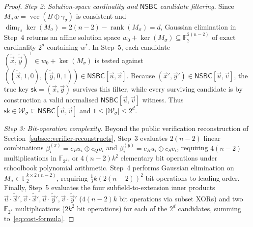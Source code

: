 \documentclass[11pt,a4paper]{article}
\theoremstyle{definition}
\theoremstyle{remark}
\newcommand{\Ftwo}{\mathbb{F}_2}
\newcommand{\Ftwok}{\mathbb{F}_{2^k}}
\newcommand{\NSBC}{\mathsf{NSBC}}
\newcommand{\sk}{\mathsf{sk}}
\newcommand{\rank}{\operatorname{rank}}
\newcommand{\vecF}{\operatorname{vec}}
\begin{document}
\begin{proof}
\smallskip\noindent
\emph{Step 2: Solution-space cardinality and $\NSBC$ candidate filtering.}
Since $M_\sigma w = \vecF(B \oplus \gamma_\sigma)$ is consistent and $\dim_{\Ftwo} \ker(M_\sigma) = 2(n-2) - \rank(M_\sigma) = d$, Gaussian elimination in Step~4 returns an affine solution space $w_0 + \ker(M_\sigma) \subseteq \Ftwo^{2(n-2)}$ of exact cardinality $2^d$ containing $w^*$. In Step~5, each candidate $(\tilde{\vec{x}}, \tilde{\vec{y}})^\top \in w_0 + \ker(M_\sigma)$ is tested against $((\tilde{\vec{x}}, 1, 0), (\tilde{\vec{y}}, 0, 1)) \in \NSBC[\vec{u}, \vec{v}]$. Because $(\vec{x}', \vec{y}') \in \NSBC[\vec{u}, \vec{v}]$, the true key $\sk = (\vec{x}, \vec{y})$ survives this filter, while every surviving candidate is by construction a valid normalised $\NSBC[\vec{u}, \vec{v}]$ witness. Thus $\sk \in \mathcal{W}_\sigma \subseteq \NSBC[\vec{u}, \vec{v}]$ and $1 \le |\mathcal{W}_\sigma| \le 2^d$.

\smallskip\noindent
\emph{Step 3: Bit-operation complexity.}
Beyond the public verification reconstruction of Section~\ref{subsec:verifier-reconstructs}, Step~3 evaluates $2(n-2)$ linear combinations $\beta_i^{(x)} = c_P u_i \oplus c_Q v_i$ and $\beta_i^{(y)} = c_R u_i \oplus c_S v_i$, requiring $4(n-2)$ multiplications in $\Ftwok$, or $4(n-2)k^2$ elementary bit operations under schoolbook polynomial arithmetic. Step~4 performs Gaussian elimination on $M_\sigma \in \Ftwo^{k \times 2(n-2)}$, requiring $\frac{1}{3} k (2(n-2))^2$ bit operations to leading order. Finally, Step~5 evaluates the four subfield-to-extension inner products $\vec{u}\cdot\tilde{\vec{x}}', \vec{v}\cdot\tilde{\vec{x}}', \vec{u}\cdot\tilde{\vec{y}}', \vec{v}\cdot\tilde{\vec{y}}'$ ($4(n-2)k$ bit operations via subset XORs) and two $\Ftwok$ multiplications ($2k^2$ bit operations) for each of the $2^d$ candidates, summing to~\eqref{eq:cost-formula}.
\end{proof}
\end{document}
